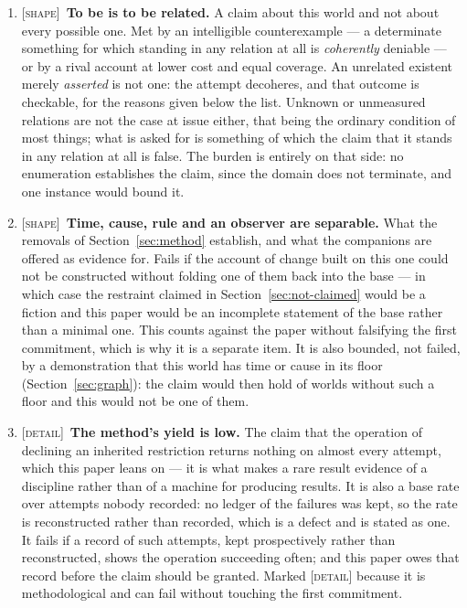 \documentclass[11pt,a4paper]{article}
\begin{document}
\begin{enumerate}[leftmargin=*]
\item \textsc{[shape]}~\textbf{To be is to be related.} A claim about this world and not about every
possible one. Met by an intelligible counterexample --- a determinate something for which standing in
any relation at all is \emph{coherently} deniable --- or by a rival account at lower cost and equal
coverage. An unrelated existent merely \emph{asserted} is not one: the attempt decoheres, and that
outcome is checkable, for the reasons given below the list. Unknown or unmeasured relations are not the
case at issue either, that being the ordinary condition of most things; what is asked for is something
of which the claim that it stands in any relation at all is false. The burden is entirely on that side:
no enumeration establishes the claim, since the domain does not terminate, and one instance would bound
it.

\item \textsc{[shape]}~\textbf{Time, cause, rule and an observer are separable.} What the removals of
Section~\ref{sec:method} establish, and what the companions are offered as evidence for. Fails if the
account of change built on this one could not be constructed without folding one of them back into the
base --- in which case the restraint claimed in Section~\ref{sec:not-claimed} would be a fiction and
this paper would be an incomplete statement of the base rather than a minimal one. This counts against
the paper without falsifying the first commitment, which is why it is a separate item. It is also
bounded, not failed, by a demonstration that this world has time or cause in its floor
(Section~\ref{sec:graph}): the claim would then hold of worlds without such a floor and this would not
be one of them.

\item \textsc{[detail]}~\textbf{The method's yield is low.} The claim that the operation of declining an
inherited restriction returns nothing on almost every attempt, which this paper leans on --- it is what
makes a rare result evidence of a discipline rather than of a machine for producing results. It is also
a base rate over attempts nobody recorded: no ledger of the failures was kept, so the rate is
reconstructed rather than recorded, which is a defect and is stated as one. It fails if a record of such
attempts, kept prospectively rather than reconstructed, shows the operation succeeding often; and this
paper owes that record before the claim should be granted. Marked \textsc{[detail]} because it is
methodological and can fail without touching the first commitment.


\end{enumerate}
\end{document}
